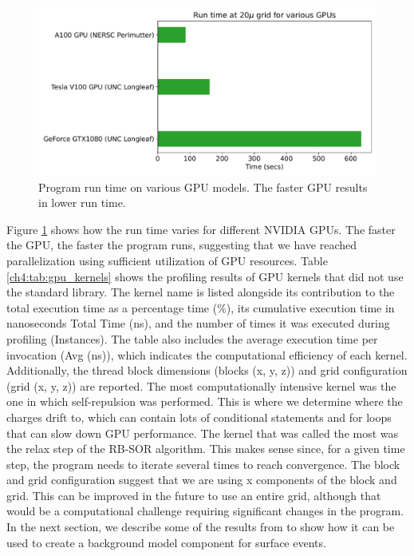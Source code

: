 \begin{figure}[!htb]
    \centering
    \includegraphics[width=0.99\linewidth]{ch4/figs/gpu_comp.pdf}
\caption{\label{ch4:fig:GPU_comp} Program run time on various GPU models. The faster GPU results in lower run time.}
\end{figure}

Figure \ref{ch4:fig:GPU_comp} shows how the run time varies for different NVIDIA GPUs. The faster the GPU, the faster the program runs, suggesting that we have reached parallelization using sufficient utilization of GPU resources. Table \ref{ch4:tab:gpu_kernels} shows the profiling results of GPU kernels that did not use the standard library. The kernel name is listed alongside its contribution to the total execution time as a percentage time ($\%$), its cumulative execution time in nanoseconds Total Time (ns), and the number of times it was executed during profiling (Instances). The table also includes the average execution time per invocation (Avg (ns)), which indicates the computational efficiency of each kernel. Additionally, the thread block dimensions (blocks (x, y, z)) and grid configuration (grid (x, y, z)) are reported. The most computationally intensive kernel was the one in which self-repulsion was performed. This is where we determine where the charges drift to, which can contain lots of conditional statements and for loops that can slow down GPU performance. The kernel that was called the most was the relax step of the RB-SOR algorithm. This makes sense since, for a given time step, the program needs to iterate several times to reach convergence. The block and grid configuration suggest that we are using x components of the block and grid. This can be improved in the future to use an entire grid, although that would be a computational challenge requiring significant changes in the program. In the next section, we describe some of the results from {\ehd} to show how it can be used to create a background model component for surface events.



